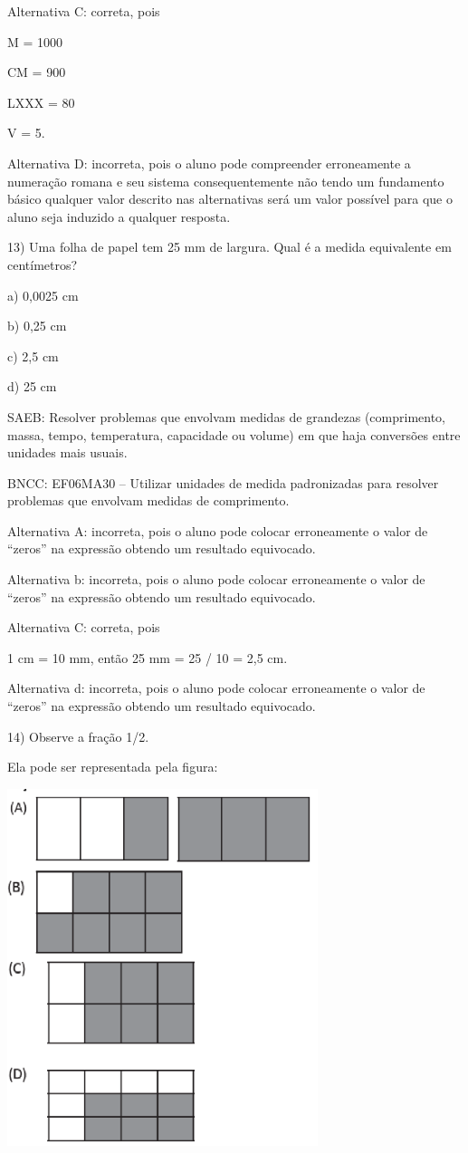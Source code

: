 Alternativa C: correta, pois

M = 1000

CM = 900

LXXX = 80

V = 5.

Alternativa D: incorreta, pois o aluno pode compreender erroneamente a
numeração romana e seu sistema consequentemente não tendo um fundamento
básico qualquer valor descrito nas alternativas será um valor possível
para que o aluno seja induzido a qualquer resposta.

13) Uma folha de papel tem 25 mm de largura. Qual é a medida equivalente
em centímetros?

a) 0,0025 cm

b) 0,25 cm

c) 2,5 cm

d) 25 cm

SAEB: Resolver problemas que envolvam medidas de grandezas (comprimento,
massa, tempo, temperatura, capacidade ou volume) em que haja conversões
entre unidades mais usuais.

BNCC: EF06MA30 -- Utilizar unidades de medida padronizadas para resolver
problemas que envolvam medidas de comprimento.

Alternativa A: incorreta, pois o aluno pode colocar erroneamente o valor
de ``zeros'' na expressão obtendo um resultado equivocado.

Alternativa b: incorreta, pois o aluno pode colocar erroneamente o valor
de ``zeros'' na expressão obtendo um resultado equivocado.

Alternativa C: correta, pois

1 cm = 10 mm, então 25 mm = 25 / 10 = 2,5 cm.

Alternativa d: incorreta, pois o aluno pode colocar erroneamente o valor
de ``zeros'' na expressão obtendo um resultado equivocado.

14) Observe a fração 1/2.

Ela pode ser representada pela figura:

\includegraphics[width=3.57531in,height=4.10869in]{./imgSAEB_6_MAT/media/image111.png}

